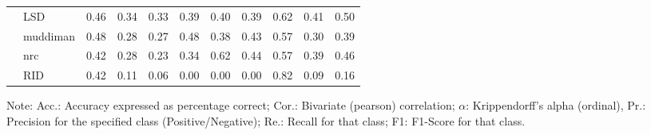 \begin{table}
\begin{tabularx}{\textwidth}{lXXrrrrrrrrr}
 & \multicolumn{2}{l}{ LSD }& \cellcolor[gray]{0.77} 0.46& \cellcolor[gray]{0.83} 0.34& \cellcolor[gray]{0.84} 0.33& \cellcolor[gray]{0.80} 0.39& \cellcolor[gray]{0.80} 0.40& \cellcolor[gray]{0.80} 0.39& \cellcolor[gray]{0.69} 0.62& \cellcolor[gray]{0.79} 0.41& \cellcolor[gray]{0.75} 0.50\\

 & \multicolumn{2}{l}{ muddiman }& \cellcolor[gray]{0.76} 0.48& \cellcolor[gray]{0.86} 0.28& \cellcolor[gray]{0.87} 0.27& \cellcolor[gray]{0.76} 0.48& \cellcolor[gray]{0.81} 0.38& \cellcolor[gray]{0.79} 0.43& \cellcolor[gray]{0.72} 0.57& \cellcolor[gray]{0.85} 0.30& \cellcolor[gray]{0.80} 0.39\\

 & \multicolumn{2}{l}{ nrc }& \cellcolor[gray]{0.79} 0.42& \cellcolor[gray]{0.86} 0.28& \cellcolor[gray]{0.89} 0.23& \cellcolor[gray]{0.83} 0.34& \cellcolor[gray]{0.69} 0.62& \cellcolor[gray]{0.78} 0.44& \cellcolor[gray]{0.72} 0.57& \cellcolor[gray]{0.80} 0.39& \cellcolor[gray]{0.77} 0.46\\

 & \multicolumn{2}{l}{ RID }& \cellcolor[gray]{0.79} 0.42& \cellcolor[gray]{0.95} 0.11& \cellcolor[gray]{0.97} 0.06& \cellcolor[gray]{1.00} 0.00& \cellcolor[gray]{1.00} 0.00& \cellcolor[gray]{1.00} 0.00& \cellcolor[gray]{0.59} 0.82& \cellcolor[gray]{0.95} 0.09& \cellcolor[gray]{0.92} 0.16\\


\bottomrule
\end{tabularx}
Note: Acc.: Accuracy expressed as percentage correct; Cor.: Bivariate (pearson) correlation; $\alpha$: Krippendorff's alpha (ordinal), Pr.: Precision for the specified class (Positive/Negative); Re.: Recall for that class; F1: F1-Score for that class.
\end{table}